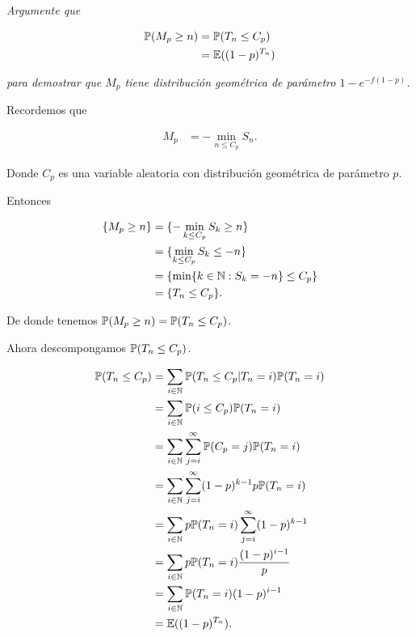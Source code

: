 \emph
{
    Argumente que
}

\begin{align}
    \mathbb{P}(M_p\geq n)  &=  \mathbb{P}(T_n\leq C_p)    \\
                    &=\mathbb{E}((1-p)^{T_n})
\end{align}\pn

\emph
{
    para demostrar que $M_p$ tiene distribuci\'on geom\'etrica de par\'ametro $1-e^{-f(1-p)}$.
}

\afterstatement\pn

    Recordemos que
    
    \begin{align}
        M_p     &=  -\min_{n\leq C_p} S_n. 
    \end{align}\pn
    
    Donde $C_p$ es una variable aleatoria con distribución geométrica de parámetro $p$.\pn
    
    Entonces 
    
    \begin{align}
        \{ M_p \geq n\}     &=  \{ -\min_{k\leq C_p} S_k \geq n \}          \\
                            &=  \{ \min_{k \leq C_p} S_k \leq -n \}         \\
                            &=  \{ \min\{ k \in \mathbb{N} : S_k = -n \}\leq C_p \}   \\
                            &=  \{ T_n \leq C_p \}.
    \end{align}\pn
    
    De donde tenemos $\mathbb{P}(M_p\geq n)=\mathbb{P}(T_n\leq C_p)$.\pn
    
    Ahora descompongamos $\mathbb{P}(T_n \leq C_p)$.
    
    \begin{align}
        \mathbb{P}(T_n \leq C_p)   &=  \sum_{i \in \mathbb{N}} \mathbb{P}(T_n \leq C_p | T_n = i) \mathbb{P}(T_n = i)        \\
                            &=  \sum_{i \in \mathbb{N}} \mathbb{P}(i \leq C_p) \mathbb{P}(T_n = i)                    \\
                            &=  \sum_{i \in \mathbb{N}} \sum_{j = i}^{\infty} \mathbb{P}(C_p = j) \mathbb{P}(T_n = i) \\
                            &=  \sum_{i \in \mathbb{N}} \sum_{j = i}^{\infty} (1-p)^{k-1} p\mathbb{P}(T_n = i) \\
                            &=  \sum_{i \in \mathbb{N}} p\mathbb{P}(T_n = i) \sum_{j = i}^{\infty} (1-p)^{k-1} \\                            
                            &=  \sum_{i \in \mathbb{N}} p\mathbb{P}(T_n = i) \frac{(1-p)^{i-1}}{p}             \\                            
                            &=  \sum_{i \in \mathbb{N}} \mathbb{P}(T_n = i) (1-p)^{i-1}                        \\                     
                            &=  \mathbb{E}((1-p)^{T_n}).                                                            
    \end{align}\pn
    
